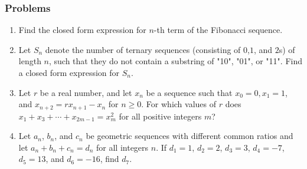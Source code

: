 \documentclass{article}
\begin{document}
			\subsubsection*{Problems}
			\begin{enumerate}[resume]
				\item 
				Find the closed form expression for $n$-th term of the Fibonacci sequence.
				\item
				Let $S_n$ denote the number of ternary sequences (consisting of $0$,$1$, and $2$s) of length $n$, such that they do not contain a substring of "10", "01", or "11". Find a closed form expression for $S_n$.
				\item
				Let $r$ be a real number, and let $x_n$ be a sequence such that $x_0 = 0, x_1 = 1$, and $x_{n+2} = rx_{n+1} - x_n$ for $n \ge 0$. For which values of $r$ does $x_1 + x_3 + \cdots + x_{2m-1} = x_m^2$ for all positive integers $m$?
				\item
				Let $a_{n}$, $b_{n}$, and $c_{n}$ be geometric sequences with different common ratios and let $a_{n}+b_{n}+c_{n}=d_{n}$ for all integers $n$. If $d_{1}=1$, $d_{2}=2$, $d_{3}=3$, $d_{4}=-7$, $d_{5}=13$, and $d_{6}=-16$, find $d_{7}$.
			\end{enumerate}	
\end{document}
